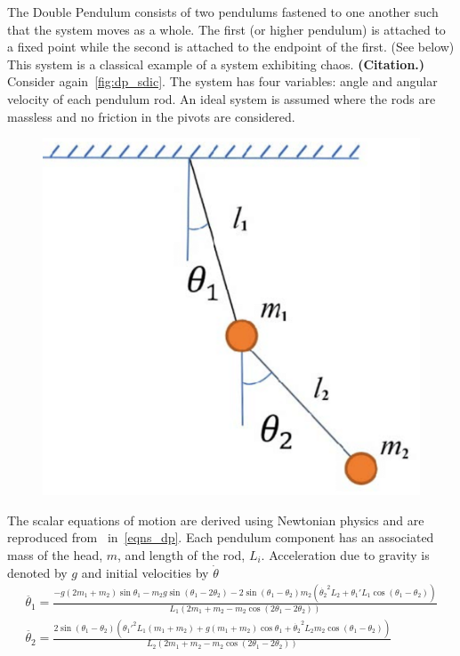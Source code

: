 \documentclass[a4paper,12pt,twoside]{report}
\begin{document}
The Double Pendulum consists of two pendulums fastened to one another such that the system moves as a whole. The first (or higher pendulum) is attached to a fixed point while the second is attached to the endpoint of the first. (See below)
This system is a classical example of a system exhibiting chaos. \textbf{(Citation.)} Consider again~\ref{fig:dp_sdic}.
The system has four variables: angle and angular velocity of each pendulum rod. An ideal system is assumed where the rods are massless and no friction in the pivots are considered.
\begin{figure}[ht]
  \includegraphics[scale=0.35]{_dp_setup.eps}
  \centering
  \label{fig:dp_setup}
\end{figure}

The scalar equations of motion are derived using Newtonian physics and are reproduced from~\cite{DPFormulas} in~\ref{eqns_dp}. Each pendulum component has an associated mass of the head, $m$, and length of the rod, $L_i$. Acceleration due to gravity is denoted by $g$ and initial velocities by $\dot{\theta}$
\begin{eqnarray}\label{eqns_dp}
  \ddot{\theta_{1}}  = \frac{-g(2m_1+m_2)\sin{\theta_1} - m_2g\sin(\theta_1-2\theta_2) - 2\sin(\theta_1-\theta_2)m_2({\dot{\theta_{2}}}^{2}L_2 + {\theta_{1}'}L_1\cos(\theta_1-\theta_2))} {L_1(2m_1 + m_2 -m_2\cos(2\theta_1 - 2\theta_2))}
  \\
  \ddot{\theta_{2}} = \frac{2\sin(\theta_1-\theta_2)(\theta_{1}'^{2}L_1(m_1+m_2) + g(m_1+m_2)\cos\theta_1 + \dot{\theta_{2}}^{2}L_2m_2\cos(\theta_1-\theta_2))}{L_2(2m_1 + m_2 -m_2\cos(2\theta_1 - 2\theta_2))}
\end{eqnarray}
\end{document}
